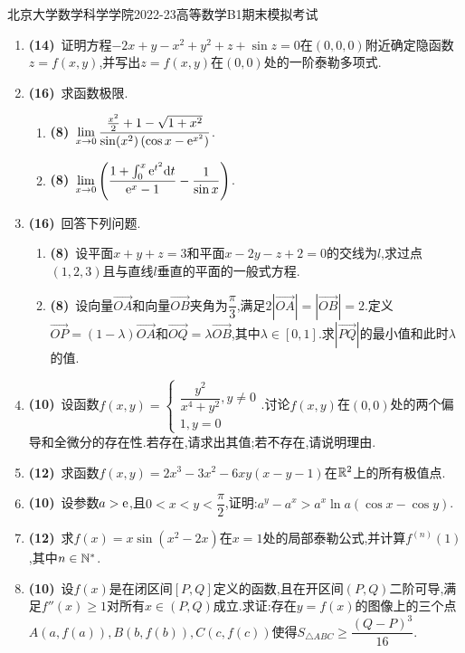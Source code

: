 \documentclass{ctexart}
\begin{document}
\pagestyle{empty}

\begin{center}\Large
    北京大学数学科学学院2022-23高等数学B1期末模拟考试
\end{center}
\begin{enumerate}[leftmargin=*,label=\textbf{\arabic*.}]
    \item \textbf{(14)}\ 证明方程$-2x+y-x^2+y^2+z+\sin z=0$在$(0,0,0)$附近确定隐函数$z=f(x,y)$,并写出$z=f(x,y)$在$(0,0)$处的一阶泰勒多项式.
    \item \textbf{(16)}\ 求函数极限.
        \begin{enumerate}[label=\textbf{(\arabic*)},leftmargin=*]
            \item \textbf{(8)}\ $\displaystyle\lim_{x\to0}\dfrac{\frac{x^2}{2}+1-\sqrt{1+x^2}}{\sin(x^2)\left(\cos x-\mathrm{e}^{x^2}\right)}$.
            \item \textbf{(8)}\ $\displaystyle\lim_{x\to0}\left(\dfrac{1+\int_0^x\mathrm{e}^{t^2}\mathrm{d} t}{\mathrm{e}^x-1}-\dfrac{1}{\sin x}\right)$.
        \end{enumerate}
    \item \textbf{(16)}\ 回答下列问题.
        \begin{enumerate}[label=\textbf{(\arabic*)},leftmargin=*]
            \item \textbf{(8)}\ 设平面$x+y+z=3$和平面$x-2y-z+2=0$的交线为$l$,求过点$(1,2,3)$且与直线$l$垂直的平面的一般式方程.
            \item \textbf{(8)}\ 设向量$\overrightarrow{OA}$和向量$\overrightarrow{OB}$夹角为$\dfrac\pi3$,满足$2\left|\overrightarrow{OA}\right|=\left|\overrightarrow{OB}\right|=2$.定义$\overrightarrow{OP}=(1-\lambda)\overrightarrow{OA}$和$\overrightarrow{OQ}=\lambda\overrightarrow{OB}$,其中$\lambda\in[0,1]$.求$\left|\overrightarrow{PQ}\right|$的最小值和此时$\lambda$的值.
        \end{enumerate}
    \item \textbf{(10)}\ 设函数$\displaystyle f(x,y)=\left\{\begin{array}{l}
        \dfrac{y^2}{x^4+y^2},y\neq0\\
        1,y=0
    \end{array}\right.$.讨论$f(x,y)$在$(0,0)$处的两个偏导和全微分的存在性.若存在,请求出其值;若不存在,请说明理由.
    \item \textbf{(12)}\ 求函数$f(x,y)=2x^3-3x^2-6xy(x-y-1)$在$\mathbb{R}^2$上的所有极值点.
    \item \textbf{(10)}\ 设参数$a>\mathrm{e}$,且$0<x<y<\dfrac\pi2$,证明:$a^y-a^x>a^x\ln a(\cos x-\cos y)$.
    \item \textbf{(12)}\ 求$f(x)=x\sin(x^2-2x)$在$x=1$处的局部泰勒公式,并计算$f^{(n)}(1)$,其中$n\in\mathbb{N}^*$.
    \item \textbf{(10)}\ 设$f(x)$是在闭区间$[P,Q]$定义的函数,且在开区间$(P,Q)$二阶可导,满足$f''(x)\geqslant1$对所有$x\in(P,Q)$成立.求证:存在$y=f(x)$的图像上的三个点%
    $A(a,f(a)),B(b,f(b)),C(c,f(c))$使得$S_{\triangle ABC}\geqslant\dfrac{(Q-P)^3}{16}$.
\end{enumerate}
\end{document}
